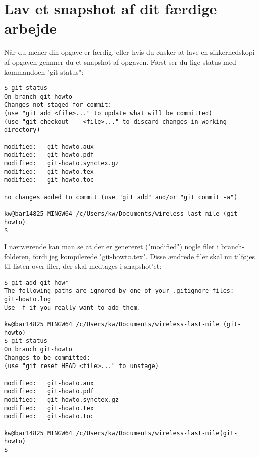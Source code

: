 \documentclass[11pt,a4paper,twoside]{report}
\begin{document}
\section{Lav et snapshot af dit færdige arbejde}
Når du mener din opgave er færdig, eller hvis du ønsker at lave en sikkerhedskopi af opgaven gemmer du et snapshot af opgaven. Først ser du lige status med kommandoen "git status":
\begin{verbatim}
$ git status
On branch git-howto
Changes not staged for commit:
(use "git add <file>..." to update what will be committed)
(use "git checkout -- <file>..." to discard changes in working directory)

modified:   git-howto.aux
modified:   git-howto.pdf
modified:   git-howto.synctex.gz
modified:   git-howto.tex
modified:   git-howto.toc

no changes added to commit (use "git add" and/or "git commit -a")

kw@bar14825 MINGW64 /c/Users/kw/Documents/wireless-last-mile (git-howto)
$
\end{verbatim}
I nærværende kan man se at der er genereret ("modified") nogle filer i branch-folderen, fordi jeg kompilerede "git-howto.tex". Disse ændrede filer skal nu tilføjes til listen over filer, der skal medtages i snapshot'et:
\begin{verbatim}
$ git add git-how*
The following paths are ignored by one of your .gitignore files:
git-howto.log
Use -f if you really want to add them.

kw@bar14825 MINGW64 /c/Users/kw/Documents/wireless-last-mile (git-howto)
$ git status
On branch git-howto
Changes to be committed:
(use "git reset HEAD <file>..." to unstage)

modified:   git-howto.aux
modified:   git-howto.pdf
modified:   git-howto.synctex.gz
modified:   git-howto.tex
modified:   git-howto.toc

kw@bar14825 MINGW64 /c/Users/kw/Documents/wireless-last-mile(git-howto)
$
\end{verbatim}
\end{document}
